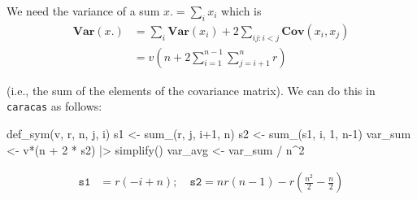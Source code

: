 \documentclass[
  ignorenonframetext,
]{beamer}
\newenvironment{Shaded}{\begin{snugshade}}{\end{snugshade}}
\newcommand{\DecValTok}[1]{\textcolor[rgb]{0.68,0.00,0.00}{#1}}
\newcommand{\FunctionTok}[1]{\textcolor[rgb]{0.28,0.35,0.67}{#1}}
\newcommand{\NormalTok}[1]{\textcolor[rgb]{0.00,0.23,0.31}{#1}}
\newcommand{\OtherTok}[1]{\textcolor[rgb]{0.00,0.23,0.31}{#1}}
\newcommand{\SpecialCharTok}[1]{\textcolor[rgb]{0.37,0.37,0.37}{#1}}
\begin{document}
\begin{frame}[fragile]
We need the variance of a sum \(x. = \sum_i x_i\) which is \begin{align}
\mathbf{Var}(x.) &= \sum_i \mathbf{Var}(x_i) + 2 \sum_{ij:i<j}
\mathbf{Cov}(x_i, x_j) \\
&= v(n + 2 \sum_{i=1}^{n-1}\sum_{j=i+1}^{n} r)
\end{align}

(i.e., the sum of the elements of the covariance matrix). We can do this
in \texttt{caracas} as follows:

\begin{Shaded}
\begin{Highlighting}[]
\FunctionTok{def\_sym}\NormalTok{(v, r, n, j, i)}
\NormalTok{s1 }\OtherTok{\textless{}{-}} \FunctionTok{sum\_}\NormalTok{(r, j, i}\SpecialCharTok{+}\DecValTok{1}\NormalTok{, n)}
\NormalTok{s2 }\OtherTok{\textless{}{-}} \FunctionTok{sum\_}\NormalTok{(s1, i, }\DecValTok{1}\NormalTok{, n}\DecValTok{{-}1}\NormalTok{)}
\NormalTok{var\_sum }\OtherTok{\textless{}{-}}\NormalTok{ v}\SpecialCharTok{*}\NormalTok{(n }\SpecialCharTok{+} \DecValTok{2} \SpecialCharTok{*}\NormalTok{ s2) }\SpecialCharTok{|\textgreater{}} \FunctionTok{simplify}\NormalTok{()}
\NormalTok{var\_avg }\OtherTok{\textless{}{-}}\NormalTok{ var\_sum }\SpecialCharTok{/}\NormalTok{ n}\SpecialCharTok{\^{}}\DecValTok{2}
\end{Highlighting}
\end{Shaded}

\begin{align}
\texttt{s1} &= r \left(- i + n\right); \quad
\texttt{s2} = n r \left(n - 1\right) - r \left(\frac{n^{2}}{2} - \frac{n}{2}\right) 
\end{align}
\end{frame}
\end{document}
